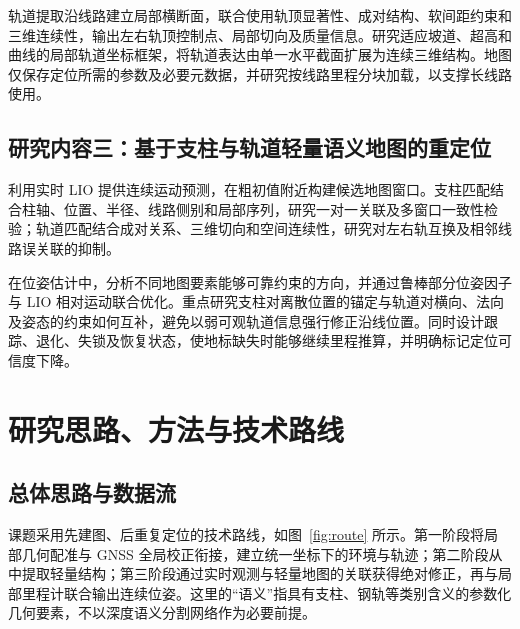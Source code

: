 \documentclass[UTF8,a4paper,12pt,fontset=fandol]{ctexart}
\begin{document}
轨道提取沿线路建立局部横断面，联合使用轨顶显著性、成对结构、软间距约束和三维连续性，输出左右轨顶控制点、局部切向及质量信息。研究适应坡道、超高和曲线的局部轨道坐标框架，将轨道表达由单一水平截面扩展为连续三维结构。地图仅保存定位所需的参数及必要元数据，并研究按线路里程分块加载，以支撑长线路使用。

\subsection{研究内容三：基于支柱与轨道轻量语义地图的重定位}

利用实时 LIO 提供连续运动预测，在粗初值附近构建候选地图窗口。支柱匹配结合柱轴、位置、半径、线路侧别和局部序列，研究一对一关联及多窗口一致性检验；轨道匹配结合成对关系、三维切向和空间连续性，研究对左右轨互换及相邻线路误关联的抑制。

在位姿估计中，分析不同地图要素能够可靠约束的方向，并通过鲁棒部分位姿因子与 LIO 相对运动联合优化。重点研究支柱对离散位置的锚定与轨道对横向、法向及姿态的约束如何互补，避免以弱可观轨道信息强行修正沿线位置。同时设计跟踪、退化、失锁及恢复状态，使地标缺失时能够继续里程推算，并明确标记定位可信度下降。

\section{研究思路、方法与技术路线}

\subsection{总体思路与数据流}

课题采用先建图、后重复定位的技术路线，如图~\ref{fig:route} 所示。第一阶段将局部几何配准与 GNSS 全局校正衔接，建立统一坐标下的环境与轨迹；第二阶段从中提取轻量结构；第三阶段通过实时观测与轻量地图的关联获得绝对修正，再与局部里程计联合输出连续位姿。这里的“语义”指具有支柱、钢轨等类别含义的参数化几何要素，不以深度语义分割网络作为必要前提。
\end{document}
